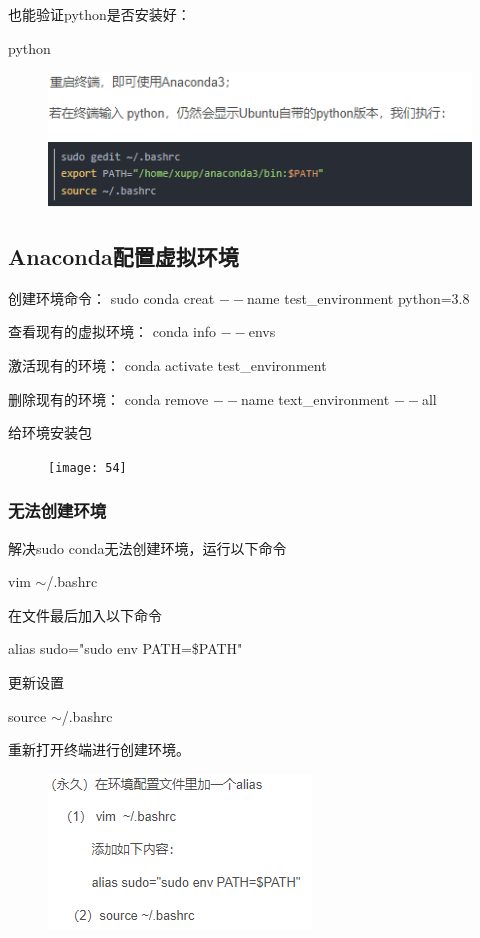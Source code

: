 \documentclass[openbib]{article}
\begin{document}
也能验证python是否安装好：

python

\begin{figure}[H]
	\centering
	\includegraphics[scale=0.5]{53}
\end{figure}

\subsection{Anaconda配置虚拟环境}

创建环境命令：
sudo conda creat $--$name test\_environment python=3.8 

查看现有的虚拟环境：
conda info $--$envs

激活现有的环境：
conda activate test\_environment

删除现有的环境：
conda remove $--$name text\_environment $--$all 

给环境安装包

\begin{figure}[H]
	\centering
	\texttt{[image: 54]}
\end{figure}
\subsubsection{无法创建环境}
解决sudo conda无法创建环境，运行以下命令

vim $\sim$/.bashrc

在文件最后加入以下命令

alias sudo="sudo env PATH=\$PATH"

更新设置

source $\sim$/.bashrc

重新打开终端进行创建环境。

\begin{figure}[H]
	\centering
	\includegraphics[scale=0.5]{61}
\end{figure}
\end{document}
